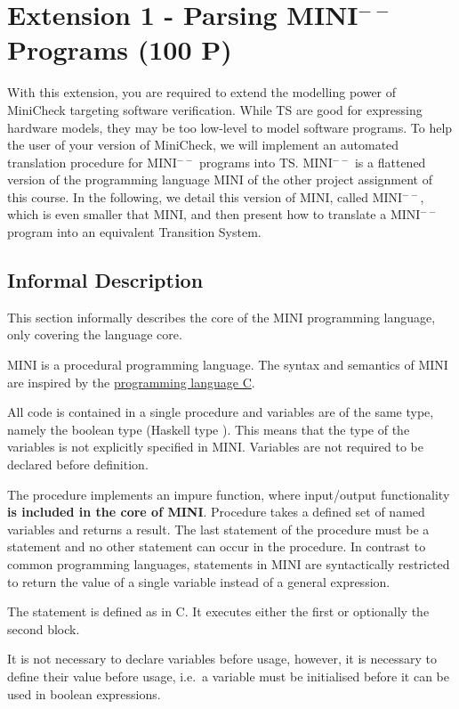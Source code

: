 \documentclass{article}
\begin{document}
\section{Extension 1 - Parsing MINI$^{--}$ Programs (100 P)}
\label{sec:ext1}
With this extension, you are required to extend the modelling power of MiniCheck targeting 
software verification. While TS are good for expressing hardware models, they may be too low-level 
to model software programs. To help the user of your version of MiniCheck, we will implement an 
automated translation procedure for MINI$^{--}$ programs into TS. MINI$^{--}$ is a flattened version of the programming language MINI of the other project assignment of this course. In the following, we detail this version of MINI, called MINI$^{--}$, which is even smaller that MINI, and then present how to translate a MINI$^{--}$ program into an equivalent Transition System.

\subsection{Informal Description}
This section informally describes the core of the MINI programming language, only covering the language core.

MINI is a procedural programming language. The syntax and semantics of MINI are inspired by the \href{https://en.wikipedia.org/wiki/C_(programming_language)}{programming language C}.

All code is contained in a single procedure  and variables are of the same type, namely the boolean type (Haskell type ). This means that the type of the variables is not explicitly specified in MINI. Variables are not required to be declared before definition.

The procedure  implements an impure function, where input/output functionality \textbf{is  included in the core of MINI}. Procedure  takes a defined set of named variables and returns a result. The last statement of the procedure must be a  statement and no other  statement can occur in the procedure. In contrast to common programming languages,  statements in MINI are syntactically restricted to return the value of a single variable instead of a general expression.

The  statement is defined as in C. It executes either the first or optionally the second block.

It is not necessary to declare variables before usage, however, it is necessary to define their value before usage, i.e.~a variable must be initialised before it can be used in boolean expressions.
\end{document}
